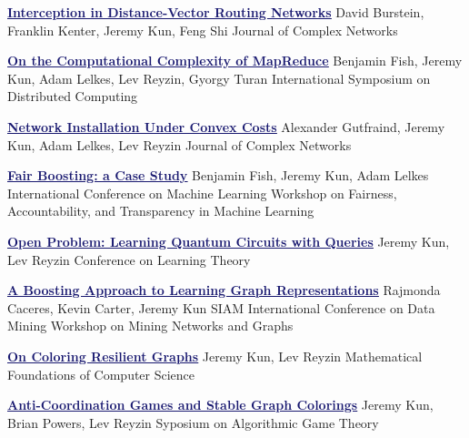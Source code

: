\documentclass[11pt]{moderncv}
\begin{document}
         {\href{http://arxiv.org/abs/1507.05206}{\textcolor{MidnightBlue}{\underline{\textbf{Interception in Distance-Vector Routing Networks}}}}}
      {David Burstein, Franklin Kenter, Jeremy Kun, Feng Shi}
      {Journal of Complex Networks}
      {}
      {}

         {\href{http://arxiv.org/abs/1410.0245}{\textcolor{MidnightBlue}{\underline{\textbf{On the Computational Complexity of MapReduce}}}}}
      {Benjamin Fish, Jeremy Kun, Adam Lelkes, Lev Reyzin, Gyorgy Turan}
      {International Symposium on Distributed Computing}
      {}
      {}

         {\href{http://comnet.oxfordjournals.org/cgi/content/abstract/cnv020?ijkey=ZiDO26VV0vKrRIO&keytype=ref}{\textcolor{MidnightBlue}{\underline{\textbf{Network Installation Under Convex Costs}}}}}
      {Alexander Gutfraind, Jeremy Kun, Adam Lelkes, Lev Reyzin}
      {Journal of Complex Networks}
      {}
      {}

         {\href{http://www.fatml.org/papers/Fish_Kun_Lelkes.pdf}{\textcolor{MidnightBlue}{\underline{\textbf{Fair Boosting: a Case Study}}}}}
      {Benjamin Fish, Jeremy Kun, Adam Lelkes}
      {International Conference on Machine Learning Workshop on Fairness, Accountability, and Transparency in Machine Learning}
      {}
      {}

         {\href{http://jmlr.org/proceedings/papers/v40/Kun15.html}{\textcolor{MidnightBlue}{\underline{\textbf{Open Problem: Learning Quantum Circuits with Queries}}}}}
      {Jeremy Kun, Lev Reyzin}
      {Conference on Learning Theory}
      {}
      {}

         {\href{http://arxiv.org/abs/1401.3258}{\textcolor{MidnightBlue}{\underline{\textbf{A Boosting Approach to Learning Graph Representations}}}}}
      {Rajmonda Caceres, Kevin Carter, Jeremy Kun}
      {SIAM International Conference on Data Mining Workshop on Mining Networks and Graphs}
      {}
      {}

         {\href{http://arxiv.org/abs/1402.4376}{\textcolor{MidnightBlue}{\underline{\textbf{On Coloring Resilient Graphs}}}}}
      {Jeremy Kun, Lev Reyzin}
      {Mathematical Foundations of Computer Science}
      {}
      {}

         {\href{http://arxiv.org/abs/1308.3258}{\textcolor{MidnightBlue}{\underline{\textbf{Anti-Coordination Games and Stable Graph Colorings}}}}}
      {Jeremy Kun, Brian Powers, Lev Reyzin}
      {Syposium on Algorithmic Game Theory}
      {}
      {}
\end{document}
